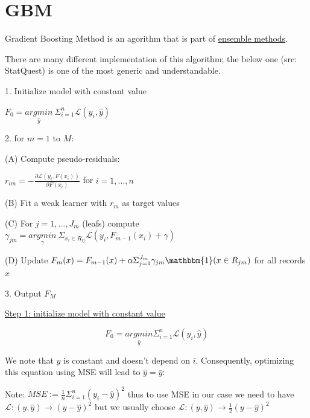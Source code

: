 \section*{GBM}

Gradient Boosting Method is an agorithm that is part of \hyperref[sec:ensemble-methods]{ensemble methods}.

There are many different implementation of this algorithm; the below one (src: StatQuest) is one of the most generic and understandable.

\vspace{5mm}

1. Initialize model with constant value

$F_0 = \underset{\hat y}{argmin} ~\Sigma_{i=1}^n \mathcal{L}(y_i,\hat y)$

2. for $m = 1$ to $M$:

\hspace{1cm} (A) Compute pseudo-residuals:

\hspace{1cm} $r_{im} = - \frac{\partial \mathcal{L}(y_i, F(x_i))}{\partial F(x_i)}$ for $i=1,...,n$

\hspace{1cm} (B) Fit a weak learner with $r_m$ as target values

\hspace{1cm} (C) For $j=1,...,J_m$ (leafs) compute $\gamma_{jm} = \underset{\gamma}{argmin}~\Sigma_{x_i \in R_{ij}} \mathcal{L}(y_i, F_{m-1}(x_i)+\gamma)$

\hspace{1cm} (D) Update $F_m(x) = F_ {m-1}(x) + \alpha \Sigma_{j=1}^{J_m} \gamma_{jm} \mathbbm{1}(x \in R_{jm})$ for all records $x$

3. Output $F_M$

\vspace{5mm}

\underline{Step 1: initialize model with constant value}

$$F_0 = \underset{\hat y}{argmin} \Sigma_{i=1}^n \mathcal{L}(y_i,\hat y)$$

We note that $\hat y$ is constant and doesn't depend on $i$. Consequently, optimizing this equation using MSE will lead to $\hat y = \bar y$:

Note: $MSE := \frac{1}{n}\Sigma_{i=1}^n (y_i - \hat y)^2$ thus to use MSE in our case we need to have $\mathcal{L}: (y,\hat y) \to (y-\hat y)^2$ but we usually choose $\mathcal{L}: (y,\hat y) \to \frac{1}{2}(y-\hat y)^2$\\

